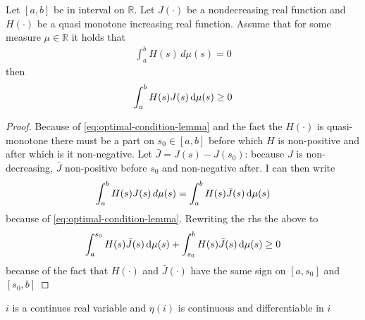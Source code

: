 \begin{lemma}\label{lem:optimal-condition-lemma}
    Let $[a,b]$ be in interval on $\mathbb{R}$. Let $J(\cdot)$ be a nondecreasing real function and $H(\cdot)$ be a quasi monotone increasing real function. Assume that for some measure $\mu\in\mathbb{R}$ it holds that
	\begin{align}
	\int_a^b H(s)\, d\mu(s)=0\label{eq:optimal-condition-lemma}
	\end{align}
   then
   \[
    	\int_a^b H(s)J(s)\dif \mu(s)\ge0
   \]

\end{lemma}
\begin{proof}
	Because of \cref{eq:optimal-condition-lemma} and the fact the $H(\cdot)$ is quasi-monotone there must be a part on $s_0\in[a,b]$ before which $H$ is non-positive and after which is it non-negative. Let $\bar{J}=J(s)-J(s_0)$: because $J$ is non-decreasing, $\bar{J}$ non-positive before $s_0$ and non-negative after. I can then write
	\[
		\int_a^b H(s)J(s)\, d\mu(s)=\int_a^b H(s)\bar{J}(s)\dif \mu(s)
	\]
because of \cref{eq:optimal-condition-lemma}. Rewriting the rhs the above to
\[
	\int_a^{s_0} H(s)\bar{J}(s)\dif \mu(s)+ \int_{s_0}^b H(s)\bar{J}(s)\dif \mu(s)\geq 0
\]
because of the fact that $H(\cdot)$ and $\bar{J}(\cdot)$ have the same sign on $[a,s_0]$ and $[s_0,b]$
\end{proof}

\begin{assumption}
	$i$ is a continues real variable and $\eta(i)$ is continuous and differentiable in $i$
\end{assumption}

